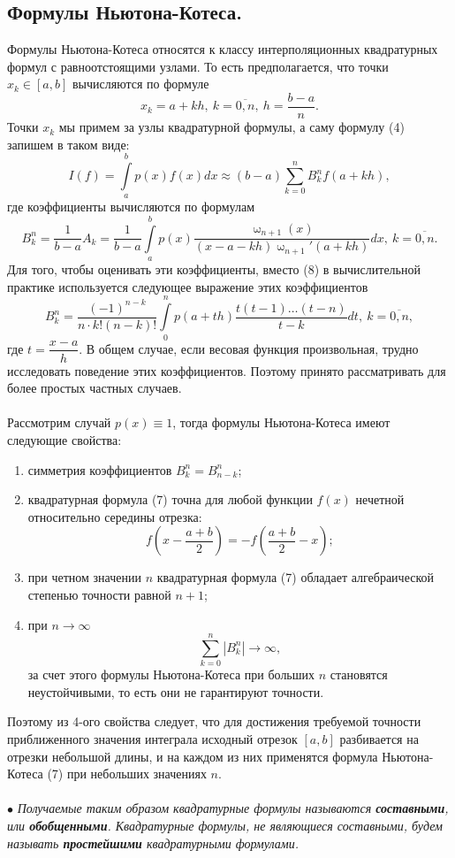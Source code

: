 \documentclass[a4paper, 12pt]{report}
\numberwithin{equation}{section}
\renewcommand{\omega}{\upomega}
\begin{document}
	 \subsection{Формулы Ньютона-Котеса.}
	 Формулы Ньютона-Котеса относятся к классу интерполяционных квадратурных формул с равноотстоящими узлами. То есть предполагается, что точки $x_k\in [a,b]$ вычисляются по формуле $$x_k = a+kh,\ k =\overline{0,n},\ h=\dfrac{b-a}{n}.$$
	 Точки $x_k$ мы примем за узлы квадратурной формулы, а саму формулу (4) запишем в таком виде: 
	 \begin{equation}
	 	I(f) = \int\limits_a^b p(x)f(x)dx \approx (b-a)\sum_{k=0}^n B_k^n f(a+kh),
	 \end{equation}
	 где коэффициенты вычисляются по формулам 
	 \begin{equation}
	 	B_k^n = \dfrac{1}{b-a}A_k = \dfrac{1}{b-a}\int\limits_a^b p(x) \dfrac{\omega_{n+1}(x)}{(x-a-kh)\omega_{n+1}'(a+kh)}dx,\ k=\overline{0,n}.
	 \end{equation} 
	 Для того, чтобы оценивать эти коэффициенты, вместо (8) в вычислительной практике используется следующее выражение этих коэффициентов 
	 \begin{equation}
	 	B_k^n = \dfrac{(-1)^{n-k}}{n\cdot k!(n-k)!}\int\limits_0^n p(a+th)\dfrac{t(t-1)\ldots (t-n)}{t-k}dt,\ k=\overline{0,n},
	 \end{equation}
	 где $t = \dfrac{x-a}{h}$. В общем случае, если весовая функция произвольная, трудно исследовать поведение этих коэффициентов. Поэтому принято рассматривать для более простых частных случаев. \\\\
	 Рассмотрим случай $p(x)\equiv1$, тогда формулы Ньютона-Котеса имеют следующие свойства:
	 \begin{enumerate}
	 	\item симметрия коэффициентов $B_k^n = B_{n-k}^n$;
	 	\item квадратурная формула (7) точна для любой функции $f(x)$ нечетной относительно середины отрезка: $$f\left(x-\dfrac{a+b}{2}\right) = -f\left(\dfrac{a+b}{2}-x\right);$$
	 	\item при четном значении $n$ квадратурная формула (7) обладает алгебраической степенью точности равной $n+1$;
	 	\item при $n\to\infty$ $$\sum_{k=0}^n |B_k^n| \to \infty,$$
	 	за счет этого формулы Ньютона-Котеса при больших $n$ становятся неустойчивыми, то есть они не гарантируют точности.
	 \end{enumerate}
	 Поэтому из 4-ого свойства следует, что для достижения требуемой точности приближенного значения интеграла исходный отрезок $[a,b]$ разбивается на отрезки небольшой длины, и на каждом из них применятся формула Ньютона-Котеса (7) при небольших значениях $n$. \\\\
	 $\bullet$ \textit{Получаемые таким образом квадратурные формулы называются \textbf{составными}, или \textbf{обобщенными}. Квадратурные формулы, не являющиеся составными, будем называть \textbf{простейшими} квадратурными формулами.}
\end{document}
